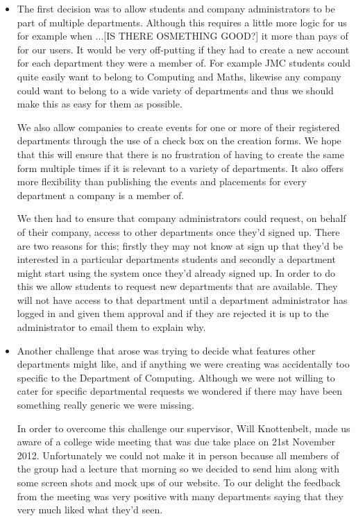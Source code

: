     \begin{itemize}
      \item  The first decision was to allow students and company administrators to be part of multiple departments. Although this requires a little more logic for us for example when ...[IS THERE OSMETHING GOOD?] it more than pays of for our users. It would be very off-putting if they had to create a new account for each department they were a member of. For example JMC students could quite easily want to belong to Computing and Maths, likewise any company could want to belong to a wide variety of departments and thus we should make this as easy for them as possible.

      We also allow companies to create events for one or more of their registered departments through the use of a check box on the creation forms. We hope that this will ensure that there is no frustration of having to create the same form multiple times if it is relevant to a variety of departments. It also offers more flexibility than publishing the events and placements for every department a company is a member of.

      We then had to ensure that company administrators could request, on behalf of their company, access to other departments once they'd signed up. There are two reasons for this; firstly they may not know at sign up that they'd be interested in a particular departments students and secondly a department might start using the system once they'd already signed up. In order to do this we allow students to request new departments that are available. They will not have access to that department until a department administrator has logged in and given them approval and if they are rejected it is up to the administrator to email them to explain why. 
      
      \item Another challenge that arose was trying to decide what features other departments might like, and if anything we were creating was accidentally too specific to the Department of Computing. Although we were not willing to cater for specific departmental requests we wondered if there may have been something really generic we were missing.

      In order to overcome this challenge our supervisor, Will Knottenbelt, made us aware of a college wide meeting that was due take place on 21st November 2012. Unfortunately we could not make it in person because all members of the group had a lecture that morning so we decided to send him along with some screen shots and mock ups of our website. To our delight the feedback from the meeting was very positive with many departments saying that they very much liked what they'd seen. 
      

\end{itemize}
